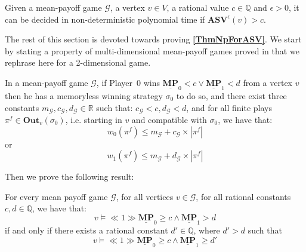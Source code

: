 \begin{theorem}
    \label{ThmNpForASV}
    Given a mean-payoff game $\mathcal{G}$, a vertex $v \in V$, a rational value $c \in \mathbb{Q}$ and $\epsilon > 0$, it can be decided in non-deterministic polynomial time if $\mathbf{ASV}^{\epsilon}(v) > c$.
\end{theorem}

\noindent The rest of this section is devoted towards proving \textbf{\cref{ThmNpForASV}}. We start by stating a property of multi-dimensional mean-payoff games proved in \cite{VCDHRR15} that we rephrase here for a 2-dimensional game.

\begin{lemma}
    \label{LemWeightPlayGrtThanC}
    In a mean-payoff game $\mathcal{G}$, if Player~0 wins $\underline{\mathbf{MP}}_0 < c \lor \underline{\mathbf{MP}}_1 < d$ from a vertex $v$ then he has a memoryless winning strategy $\sigma_0$ to do so, and there exist three constants $m_\mathcal{G}, c_\mathcal{G}, d_\mathcal{G} \in \mathbb{R}$ such that: $c_\mathcal{G} < c, d_\mathcal{G} < d$, and for all finite plays $\pi^f \in \mathbf{Out}_v(\sigma_0)$, i.e. starting in $v$ and compatible with $\sigma_0$, we have that:
    \begin{equation*}
        w_0(\pi^f) \leqslant m_\mathcal{G} + c_\mathcal{G} \times |\pi^f|
    \end{equation*}
    or
    \begin{equation*}
        w_1(\pi^f) \leqslant m_\mathcal{G} + d_\mathcal{G} \times |\pi^f|
    \end{equation*}
\end{lemma}

\noindent Then we prove the following result:

\begin{lemma}
    \label{ConjGrtIsGrtEq}
    For every mean payoff game $\mathcal{G}$, for all vertices $v \in \mathcal{G}$, for all rational constants $c, d \in \mathbb{Q}$, we have that:
    \begin{equation*}
        v \models \ll 1 \gg \underline{\mathbf{MP}}_0 \geqslant c \land \underline{\mathbf{MP}}_1 > d
    \end{equation*}
    if and only if there exists a rational constant $d' \in \mathbb{Q}$, where $d' > d$ such that
    \begin{equation*}
        v \models \ll 1 \gg \underline{\mathbf{MP}}_0 \geqslant c \land \underline{\mathbf{MP}}_1 \geqslant d'
    \end{equation*}
\end{lemma}

